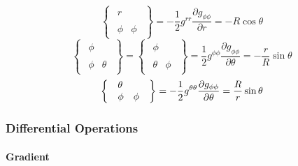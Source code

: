\begin{equation}
\left\{ 
\begin{array}{l}
\begin{array}{ll}
r & \ 
\end{array}
\\ 
\begin{array}{ll}
\phi & \phi%
\end{array}%
\end{array}%
\right\} =-\frac{1}{2}g^{rr}\frac{\partial g_{\phi \phi }}{\partial r}%
=-R\cos \theta
\end{equation}%
\begin{equation}
\left\{ 
\begin{array}{l}
\begin{array}{ll}
\phi & \ 
\end{array}
\\ 
\begin{array}{ll}
\phi & \theta%
\end{array}%
\end{array}%
\right\} =\left\{ 
\begin{array}{l}
\begin{array}{ll}
\phi & \ 
\end{array}
\\ 
\begin{array}{ll}
\theta & \phi%
\end{array}%
\end{array}%
\right\} =\frac{1}{2}g^{\phi \phi }\frac{\partial g_{\phi \phi }}{\partial
\theta }=-\frac{r}{R}\sin \theta
\end{equation}%
\begin{equation}
\left\{ 
\begin{array}{l}
\begin{array}{ll}
\theta & \ 
\end{array}
\\ 
\begin{array}{ll}
\phi & \phi%
\end{array}%
\end{array}%
\right\} =-\frac{1}{2}g^{\theta \theta }\frac{\partial g_{\phi \phi }}{%
\partial \theta }=\frac{R}{r}\sin \theta
\end{equation}

\subsubsection{Differential Operations}

\paragraph{Gradient}

